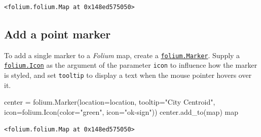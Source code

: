 \documentclass[
  letterpaper,
  DIV=11,
  numbers=noendperiod]{scrreprt}
\newenvironment{Shaded}{\begin{snugshade}}{\end{snugshade}}
\newcommand{\BuiltInTok}[1]{\textcolor[rgb]{0.00,0.23,0.31}{#1}}
\newcommand{\NormalTok}[1]{\textcolor[rgb]{0.00,0.23,0.31}{#1}}
\newcommand{\OperatorTok}[1]{\textcolor[rgb]{0.37,0.37,0.37}{#1}}
\newcommand{\StringTok}[1]{\textcolor[rgb]{0.13,0.47,0.30}{#1}}
\begin{document}
\begin{verbatim}
<folium.folium.Map at 0x148ed575050>
\end{verbatim}

\subsection{Add a point marker}\label{add-a-point-marker}

To add a single marker to a \emph{Folium} map, create a
\href{https://python-visualization.github.io/folium/modules.html\#folium.map.Marker}{\texttt{folium.Marker}}.
Supply a
\href{https://python-visualization.github.io/folium/modules.html\#folium.map.Icon}{\texttt{folium.Icon}}
as the argument of the parameter \texttt{icon} to influence how the
marker is styled, and set \texttt{tooltip} to display a text when the
mouse pointer hovers over it.

\begin{Shaded}
\begin{Highlighting}[]
\NormalTok{center }\OperatorTok{=}\NormalTok{ folium.Marker(location}\OperatorTok{=}\NormalTok{location, tooltip}\OperatorTok{=}\StringTok{"City Centroid"}\NormalTok{, icon}\OperatorTok{=}\NormalTok{folium.Icon(color}\OperatorTok{=}\StringTok{"green"}\NormalTok{, icon}\OperatorTok{=}\StringTok{"ok{-}sign"}\NormalTok{))}
\NormalTok{center.add\_to(}\BuiltInTok{map}\NormalTok{)}
\BuiltInTok{map}
\end{Highlighting}
\end{Shaded}

\begin{verbatim}
<folium.folium.Map at 0x148ed575050>
\end{verbatim}
\end{document}
